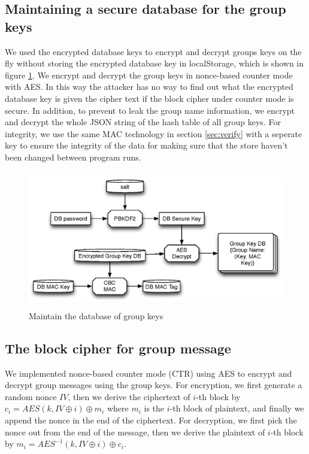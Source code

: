 \subsection{Maintaining a secure database for the group keys}
We used the encrypted database keys to encrypt and decrypt groups keys on the fly without storing the encrypted database key in localStorage, which is shown in figure \ref{fig:db}. We encrypt and decrypt the group keys in nonce-based counter mode with AES.  In this way the attacker has no way to find out what the encrypted database key is given the cipher text if the block cipher under counter mode is secure. 
In addition, to prevent to leak the group name information, we encrypt and decrypt the whole JSON string of the hash table of all group keys. For integrity, we use the same MAC technology in section \ref{sec:verify} with a seperate key to ensure the integrity of the data for making sure that the store haven't been changed between program runs.
\begin{figure}[h!]
\centering
\caption{Maintain the database of group keys}
\label{fig:db}
\includegraphics[height=6cm]{fig/db.eps}
\vspace{-1cm}
\end{figure}

\subsection{The block cipher for group message}
We implemented nonce-based counter mode (CTR) using AES to encrypt and decrypt group messages using the group keys. 
For encryption, we first generate a random nonce $IV$, then we derive the ciphertext of $i$-th block by $c_i = AES(k, IV \oplus i) \oplus m_i$ where $m_i$ is the $i$-th block of plaintext, and finally we append the nonce in the end of the ciphertext. For decryption, we first pick the nonce out from the end of the message, then we derive the plaintext of $i$-th block by $m_i = AES^{-1}(k, IV \oplus i) \oplus c_i$. 

